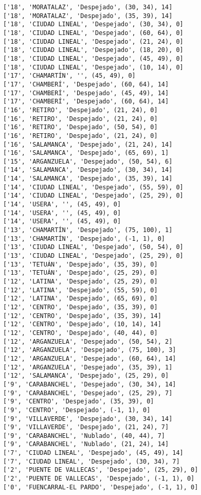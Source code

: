 \documentclass[11pt]{article}
\begin{document}
\begin{Verbatim}[commandchars=\\\{\}]
['18', 'MORATALAZ', 'Despejado', (30, 34), 14]
['18', 'MORATALAZ', 'Despejado', (35, 39), 14]
['18', 'CIUDAD LINEAL', 'Despejado', (30, 34), 0]
['18', 'CIUDAD LINEAL', 'Despejado', (60, 64), 0]
['18', 'CIUDAD LINEAL', 'Despejado', (21, 24), 0]
['18', 'CIUDAD LINEAL', 'Despejado', (18, 20), 0]
['18', 'CIUDAD LINEAL', 'Despejado', (45, 49), 0]
['18', 'CIUDAD LINEAL', 'Despejado', (10, 14), 0]
['17', 'CHAMARTÍN', '', (45, 49), 0]
['17', 'CHAMBERÍ', 'Despejado', (60, 64), 14]
['17', 'CHAMBERÍ', 'Despejado', (45, 49), 14]
['17', 'CHAMBERÍ', 'Despejado', (60, 64), 14]
['16', 'RETIRO', 'Despejado', (21, 24), 0]
['16', 'RETIRO', 'Despejado', (21, 24), 0]
['16', 'RETIRO', 'Despejado', (50, 54), 0]
['16', 'RETIRO', 'Despejado', (21, 24), 0]
['16', 'SALAMANCA', 'Despejado', (21, 24), 14]
['16', 'SALAMANCA', 'Despejado', (65, 69), 1]
['15', 'ARGANZUELA', 'Despejado', (50, 54), 6]
['14', 'SALAMANCA', 'Despejado', (30, 34), 14]
['14', 'SALAMANCA', 'Despejado', (35, 39), 14]
['14', 'CIUDAD LINEAL', 'Despejado', (55, 59), 0]
['14', 'CIUDAD LINEAL', 'Despejado', (25, 29), 0]
['14', 'USERA', '', (45, 49), 0]
['14', 'USERA', '', (45, 49), 0]
['14', 'USERA', '', (45, 49), 0]
['13', 'CHAMARTÍN', 'Despejado', (75, 100), 1]
['13', 'CHAMARTÍN', 'Despejado', (-1, 1), 0]
['13', 'CIUDAD LINEAL', 'Despejado', (50, 54), 0]
['13', 'CIUDAD LINEAL', 'Despejado', (25, 29), 0]
['13', 'TETUÁN', 'Despejado', (35, 39), 0]
['13', 'TETUÁN', 'Despejado', (25, 29), 0]
['12', 'LATINA', 'Despejado', (25, 29), 0]
['12', 'LATINA', 'Despejado', (55, 59), 0]
['12', 'LATINA', 'Despejado', (65, 69), 0]
['12', 'CENTRO', 'Despejado', (35, 39), 0]
['12', 'CENTRO', 'Despejado', (35, 39), 14]
['12', 'CENTRO', 'Despejado', (10, 14), 14]
['12', 'CENTRO', 'Despejado', (40, 44), 0]
['12', 'ARGANZUELA', 'Despejado', (50, 54), 2]
['12', 'ARGANZUELA', 'Despejado', (75, 100), 3]
['12', 'ARGANZUELA', 'Despejado', (60, 64), 14]
['12', 'ARGANZUELA', 'Despejado', (35, 39), 1]
['12', 'SALAMANCA', 'Despejado', (25, 29), 0]
['9', 'CARABANCHEL', 'Despejado', (30, 34), 14]
['9', 'CARABANCHEL', 'Despejado', (25, 29), 7]
['9', 'CENTRO', 'Despejado', (35, 39), 0]
['9', 'CENTRO', 'Despejado', (-1, 1), 0]
['9', 'VILLAVERDE', 'Despejado', (30, 34), 14]
['9', 'VILLAVERDE', 'Despejado', (21, 24), 7]
['9', 'CARABANCHEL', 'Nublado', (40, 44), 7]
['9', 'CARABANCHEL', 'Nublado', (21, 24), 14]
['7', 'CIUDAD LINEAL', 'Despejado', (45, 49), 14]
['7', 'CIUDAD LINEAL', 'Despejado', (30, 34), 7]
['2', 'PUENTE DE VALLECAS', 'Despejado', (25, 29), 0]
['2', 'PUENTE DE VALLECAS', 'Despejado', (-1, 1), 0]
['0', 'FUENCARRAL-EL PARDO', 'Despejado', (-1, 1), 0]

\end{Verbatim}
\end{document}
